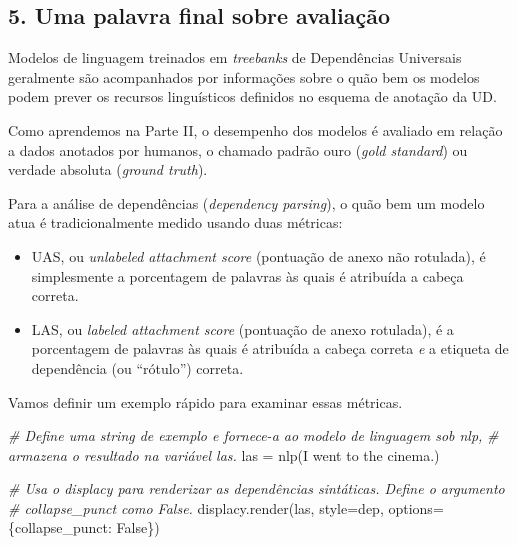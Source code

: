 \documentclass[
  brazilian,
]{article}
\newenvironment{Shaded}{}{}
\newcommand{\CommentTok}[1]{\textcolor[rgb]{0.38,0.63,0.69}{\textit{#1}}}
\newcommand{\NormalTok}[1]{#1}
\newcommand{\OperatorTok}[1]{\textcolor[rgb]{0.40,0.40,0.40}{#1}}
\newcommand{\StringTok}[1]{\textcolor[rgb]{0.25,0.44,0.63}{#1}}
\newcommand{\VariableTok}[1]{\textcolor[rgb]{0.10,0.09,0.49}{#1}}
\providecommand{\tightlist}{%
  \setlength{\itemsep}{0pt}\setlength{\parskip}{0pt}}
\begin{document}
\hypertarget{uma-palavra-final-sobre-avaliauxe7uxe3o}{%
\subsection{5. Uma palavra final sobre
avaliação}\label{uma-palavra-final-sobre-avaliauxe7uxe3o}}

Modelos de linguagem treinados em \emph{treebanks} de Dependências
Universais geralmente são acompanhados por informações sobre o quão bem
os modelos podem prever os recursos linguísticos definidos no esquema de
anotação da UD.

Como aprendemos na Parte II, o desempenho dos modelos é avaliado em
relação a dados anotados por humanos, o chamado padrão ouro (\emph{gold
standard}) ou verdade absoluta (\emph{ground truth}).

Para a análise de dependências (\emph{dependency parsing}), o quão bem
um modelo atua é tradicionalmente medido usando duas métricas:

\begin{itemize}
\tightlist
\item
  UAS, ou \emph{unlabeled attachment score} (pontuação de anexo não
  rotulada), é simplesmente a porcentagem de palavras às quais é
  atribuída a cabeça correta.
\item
  LAS, ou \emph{labeled attachment score} (pontuação de anexo rotulada),
  é a porcentagem de palavras às quais é atribuída a cabeça correta
  \emph{e} a etiqueta de dependência (ou ``rótulo'') correta.
\end{itemize}

Vamos definir um exemplo rápido para examinar essas métricas.

\begin{Shaded}
\begin{Highlighting}[]
\CommentTok{\# Define uma string de exemplo e fornece{-}a ao modelo de linguagem sob \textquotesingle{}nlp\textquotesingle{},}
\CommentTok{\# armazena o resultado na variável \textquotesingle{}las\textquotesingle{}.}
\NormalTok{las }\OperatorTok{=}\NormalTok{ nlp(}\StringTok{\textquotesingle{}I went to the cinema.\textquotesingle{}}\NormalTok{)}

\CommentTok{\# Usa o displacy para renderizar as dependências sintáticas. Define o argumento}
\CommentTok{\# \textquotesingle{}collapse\_punct\textquotesingle{} como False.}
\NormalTok{displacy.render(las, style}\OperatorTok{=}\StringTok{\textquotesingle{}dep\textquotesingle{}}\NormalTok{, options}\OperatorTok{=}\NormalTok{\{}\StringTok{\textquotesingle{}collapse\_punct\textquotesingle{}}\NormalTok{: }\VariableTok{False}\NormalTok{\})}
\end{Highlighting}
\end{Shaded}
\end{document}
